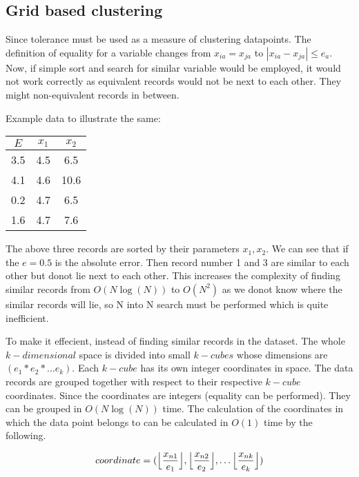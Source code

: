 \subsection{Grid based clustering}

Since tolerance must be used as a measure of clustering datapoints. The definition of equality for a variable changes from \(x_{ia} = x_{ja}\) to \(|x_{ia} - x_{ja}| \leq e_a\). Now, if simple sort and search for similar variable would be employed, it would not work correctly as equivalent records would not be next to each other. They might non-equivalent records in between.

Example data to illustrate the same:
\begin{center}
	\begin{tabular}{ | c | c | c |}
		\hline
		\(E\) & \(x_1\) & \(x_2\) \\ \hline
		3.5   & 4.5     & 6.5     \\\hline
		4.1   & 4.6     & 10.6    \\\hline
		0.2   & 4.7     & 6.5     \\\hline
		1.6   & 4.7     & 7.6     \\\hline
		\hline
	\end{tabular}
\end{center}

The above three records are sorted by their parameters \(x_1, x_2\). We can see that if the \(e = 0.5\) is the absolute error. Then record number 1 and 3 are similar to each other but donot lie next to each other. This increases the complexity of finding similar records from \(O(N \log(N))\) to \(O(N^2)\) as we donot know where the similar records will lie, so N into N search must be performed which is quite inefficient.

To make it effecient, instead of finding similar records in the dataset. The whole \(k-dimensional\) space is divided into small \(k-cubes\) whose dimensions are \((e_1 * e_2 * \ldots e_k)\). Each \(k-cube\) has its own integer coordinates in space. The data records are grouped together with respect to their respective \(k-cube\) coordinates. Since the coordinates are integers (equality can be performed). They can be grouped in \(O(N\log(N))\) time. The calculation of the coordinates in which the data point belongs to can be calculated in \(O(1)\) time by the following.

\[coordinate = (\Bigl\lfloor \frac{x_{n1}}{e_1} \Bigl\rfloor, \Bigl\lfloor \frac{x_{n2}}{e_2} \Bigl\rfloor, \ldots \Bigl\lfloor \frac{x_{nk}}{e_k} \Bigl\rfloor)\]

